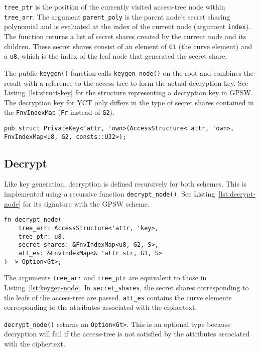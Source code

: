 \verb+tree_ptr+ is the position of the currently visited \gls{access-tree} node within \verb+tree_arr+.
The argument \verb+parent_poly+ is the parent node's secret sharing polynomial and is evaluated at the index of the current node (argument \texttt{index}).
The function returns a list of secret shares created by the current node and its children. 
These secret shares consist of an element of \texttt{G1} (the curve element) and a \texttt{u8}, which is the index of the leaf node that generated the secret share.

The public \verb+keygen()+ function calls \verb+keygen_node()+ on the root and combines the result with a reference to the \gls{access-tree} to form the actual decryption key.
See Listing~\ref{lst:struct-key} for the structure representing a decryption key in GPSW.
The decryption key for YCT only differs in the type of secret shares contained in the \texttt{FnvIndexMap} (\texttt{Fr} instead of \texttt{G2}).

\begin{lstlisting}[float=h,caption={Decryption key struct},label={lst:struct-key}, breaklines=true]
pub struct PrivateKey<'attr, 'own>(AccessStructure<'attr, 'own>, FnvIndexMap<u8, G2, consts::U32>);
\end{lstlisting}

\subsection{Decrypt}
Like key generation, decryption is defined recursively for both schemes.
This is implemented using a recursive function \verb+decrypt_node()+.
See Listing~\ref{lst:decrypt-node} for its signature with the GPSW scheme.

\begin{lstlisting}[float=h!, caption={Function signature of recursive decryption},label={lst:decrypt-node}]
fn decrypt_node(
    tree_arr: AccessStructure<'attr, 'key>,
    tree_ptr: u8,
    secret_shares: &FnvIndexMap<u8, G2, S>,
    att_es: &FnvIndexMap<& 'attr str, G1, S>
) -> Option<Gt>;
\end{lstlisting}

The arguments \verb+tree_arr+ and \verb+tree_ptr+ are equivalent to those in Listing~\ref{lst:keygen-node}.
In \verb+secret_shares+, the secret shares corresponding to the leafs of the \gls{access-tree} are passed.
\verb+att_es+ contains the curve elements corresponding to the attributes associated with the ciphertext.

\verb+decrypt_node()+ returns an \verb+Option<Gt>+.
This is an optional type because decryption will fail if the \gls{access-tree} is not satisfied by the attributes associated with the ciphertext.

